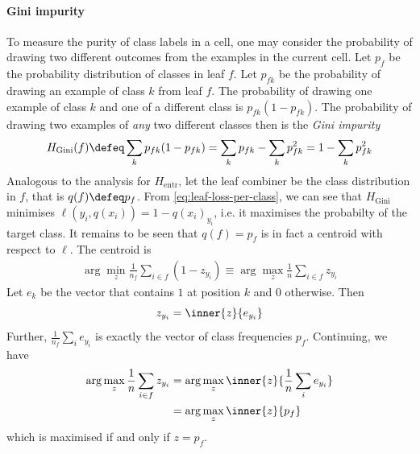 \documentclass[../main.tex]{subfiles}
\begin{document}
\paragraph{Gini impurity} 
To measure the purity of class labels in a cell, one may consider the probability of drawing two different outcomes from the examples in the current cell. 
Let $p_{f}$ be the probability distribution of classes in leaf $f$. Let $p_{fk}$ be the probability of drawing an example of class $k$ from leaf $f$.
The probability of drawing one example of class $k$ and one of a different class is $p_{fk}(1-p_{fk})$.
The probability of drawing two examples of \textit{any} two different classes then is the \textit{Gini impurity}
$$
H_{\text{Gini}}(f) \defeq \sum_{k}p_{fk}(1-p_{fk}) = \sum_k p_{fk} - \sum_k p_{fk}^2 = 1 - \sum_k p_{fk}^2
$$
Analogous to the analysis for $H_{\text{entr}}$, let the leaf combiner be the class distribution in $f$, that is $q(f) \defeq p_{f}$.
From \cref{eq:leaf-loss-per-class}, we can see that $H_{\text{Gini}}$ minimises $\ell(y_{i}, q(x_{i})) = 1 - q(x_{i})_{y_{i}}$, i.e. it maximises the probabilty of the target class.
It remains to be seen that $q(f) = p_{f}$  is in fact a centroid with respect to $\ell$. The centroid is
\begin{align*}
\arg \min_{z} \frac{1}{n_{f}} \sum_{i \in f} (1 - z_{y_{i}}) \equiv \arg\max_{z} \frac{1}{n} \sum_{i \in f} z_{y_{i}}
\end{align*}
Let $e_{k}$ be the vector that contains $1$ at position $k$ and $0$ otherwise. Then 
$$
z_{y_{i}} = \inner{z}{e_{y_{i}}}
$$
Further, $\frac{1}{n_{f}} \sum_{i} e_{y_{i}}$ is exactly the vector of class frequencies $p_{f}$. Continuing, we have
\begin{align*}
\arg\max_{z} \frac{1}{n} \sum_{i \in f} z_{y_{i}} &= \arg \max_{z} \inner{z}{\frac{1}{n} \sum_{i} e_{y_{i}}}  \\
&= \arg \max_{z} \inner{z}{p_{f}}
\end{align*}
which is maximised if and only if $z = p_{f}$.

\end{document}
